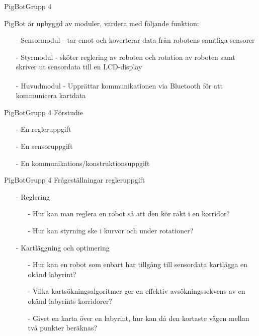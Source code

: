 \begin{frame}[fragile]{PigBot}{Grupp 4}

PigBot är upbyggd av moduler, vardera med följande funktion:
  \begin{itemize}
\pause
    \item[-] Sensormodul - tar emot och koverterar data från robotens samtliga sensorer
\pause
    \item[-] Styrmodul - sköter reglering av roboten och rotation av roboten samt skriver ut sensordata till en LCD-display
\pause
    \item[-] Huvudmodul - Upprättar kommunikationen via Bluetooth\textsuperscript{\circledR} för att kommunicera kartdata
  \end{itemize}
\end{frame}


\begin{frame}[fragile]{PigBot}{Grupp 4}
Förstudie
\pause
  \begin{itemize}
    \item[-] En regleruppgift
    \item[-] En sensoruppgift 
    \item[-] En kommunikations/konstruktionsuppgift
  \end{itemize}
\end{frame}


\begin{frame}[fragile]{PigBot}{Grupp 4}
Frågeställningar regleruppgift
  \begin{itemize}
\pause
    \item[-] Reglering
\pause
\begin{itemize}
	\item [-] Hur kan man reglera en robot så att den kör rakt i en korridor?
	\item [-] Hur kan styrning ske i kurvor och under rotationer?
\end{itemize}
\pause
    \item[-] Kartläggning och optimering 
\begin{itemize}
	\item [-] Hur kan en robot som enbart har tillgång till sensordata kartlägga en okänd labyrint?
	\item [-] Vilka kartsökningsalgoritmer ger en effektiv avsökningssekvens av en okänd labyrints korridorer?
	\item [-] Givet en karta över en labyrint, hur kan då den kortaste vägen mellan två punkter beräknas?
\end{itemize}
  \end{itemize}
\end{frame}

